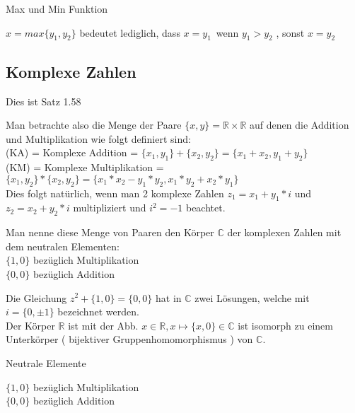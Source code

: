 \documentclass[headsepline,12pt,a4paper]{scrartcl}
\begin{document}
\begin{center}
\item[Max und Min Funktion]
\end{center}
\item $x = max\{y_1,y_2\} $ bedeutet lediglich, dass $ x=y_1 \, $ wenn $ y_1 > y_2 $ , sonst $ x = y_2 $

\newpage

\subsection*{Komplexe Zahlen}

\item Dies ist Satz 1.58\\

\item Man betrachte also die Menge der Paare $\{x,y\}= \mathbb{R} \times \mathbb{R} $ auf denen die Addition und Multiplikation wie folgt definiert sind: \\
(KA) = Komplexe Addition = $\{x_1,y_1\} + \{x_2,y_2\} = \{x_1+x_2,y_1+y_2\} $ \\

(KM) = Komplexe Multiplikation = $\{x_1,y_2\} * \{x_2,y_2\} = \{x_1 * x_2 - y_1*y_2 , x_1 *y_2 + x_2 * y_1\} $ \\ 
Dies folgt natürlich, wenn man 2 komplexe Zahlen $z_1 = x_1 + y_1 * i $ und $z_2 = x_2 + y_2 * i  $ multipliziert und $i^2= -1$ beachtet. \\

\item Man nenne diese Menge von Paaren den Körper $\mathbb{C}$ der komplexen Zahlen mit dem neutralen Elementen: \\
$\{1,0\}$ bezüglich Multiplikation\\
$\{0,0\}$ bezüglich Addition \\

\item Die Gleichung $ z^2 + \{1,0\} = \{0,0\} $ hat in $\mathbb{C}$ zwei Lösungen, welche mit \\
$i=\{0,\pm 1\} $ bezeichnet werden. \\
Der Körper $\mathbb{R}$ ist mit der Abb. $x \in \mathbb{R}, x \mapsto \{x,0\} \in \mathbb{C} $ ist isomorph 
zu einem Unterkörper ( bijektiver Gruppenhomomorphismus ) von $\mathbb{C}$. \\

\begin{center}
\item[Neutrale Elemente]
\end{center}
\item 
$\{1,0\}$ bezüglich Multiplikation\\
$\{0,0\}$ bezüglich Addition \\
\end{document}

